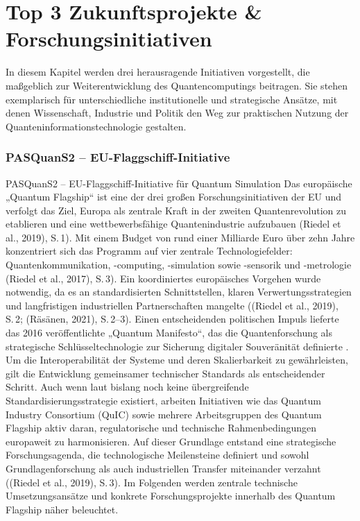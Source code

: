 \section{Top 3 Zukunftsprojekte \& Forschungsinitiativen}

In diesem Kapitel werden drei herausragende Initiativen vorgestellt, die maßgeblich zur Weiterentwicklung des Quantencomputings beitragen. Sie stehen exemplarisch für unterschiedliche institutionelle und strategische Ansätze, mit denen Wissenschaft, Industrie und Politik den Weg zur praktischen Nutzung der Quanteninformationstechnologie gestalten. 

\subsubsection*{PASQuanS2 – EU-Flaggschiff-Initiative}
PASQuanS2 – EU-Flaggschiff-Initiative für Quantum Simulation
Das europäische „Quantum Flagship“ ist eine der drei großen Forschungsinitiativen der EU und verfolgt das Ziel, Europa als zentrale Kraft in der zweiten Quantenrevolution zu etablieren und eine wettbewerbsfähige Quantenindustrie aufzubauen \citealp[1]{r} \cite{}(Riedel et al., 2019), S. 1). Mit einem Budget von rund einer Milliarde Euro über zehn Jahre konzentriert sich das Programm auf vier zentrale Technologiefelder: Quantenkommunikation, -computing, -simulation sowie -sensorik und -metrologie \cite{}(Riedel et al., 2017), S. 3).
Ein koordiniertes europäisches Vorgehen wurde notwendig, da es an standardisierten Schnittstellen, klaren Verwertungsstrategien und langfristigen industriellen Partnerschaften mangelte \cite{}((Riedel et al., 2019), S. 2; \citealp[2ff.]{}(Räsänen, 2021), S. 2–3). Einen entscheidenden politischen Impuls lieferte das 2016 veröffentlichte „Quantum Manifesto“, das die Quantenforschung als strategische Schlüsseltechnologie zur Sicherung digitaler Souveränität definierte \citealp[1]{vandeventerEuropeanStandardsQuantum2022}. Um die Interoperabilität der Systeme und deren Skalierbarkeit zu gewährleisten, gilt die Entwicklung gemeinsamer technischer Standards als entscheidender Schritt. Auch wenn laut \citealp[2ff.]{vandeventerEuropeanStandardsQuantum2022} bislang noch keine übergreifende Standardisierungsstrategie existiert, arbeiten Initiativen wie das Quantum Industry Consortium (QuIC) sowie mehrere Arbeitsgruppen des Quantum Flagship aktiv daran, regulatorische und technische Rahmenbedingungen europaweit zu harmonisieren. Auf dieser Grundlage entstand eine strategische Forschungsagenda, die technologische Meilensteine definiert und sowohl Grundlagenforschung als auch industriellen Transfer miteinander verzahnt \cite{}((Riedel et al., 2019), S. 3). Im Folgenden werden zentrale technische Umsetzungsansätze und konkrete Forschungsprojekte innerhalb des Quantum Flagship näher beleuchtet.
